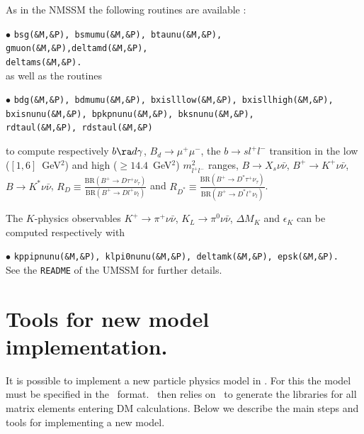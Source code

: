 \documentclass[12pt,a4paper]{article}
\begin{document}
As in the NMSSM the following routines are available :

\noindent
$\bullet$ {\tt bsg(\&M,\&P), bsmumu(\&M,\&P), btaunu(\&M,\&P),  gmuon(\&M,\&P),deltamd(\&M,\&P),}\\
{\tt deltams(\&M,\&P).}\\ 

\noindent as well as the routines

\noindent
$\bullet$ {\tt bdg(\&M,\&P), bdmumu(\&M,\&P), bxislllow(\&M,\&P), bxisllhigh(\&M,\&P),}\\ 
{\tt bxisnunu(\&M,\&P), bpkpnunu(\&M,\&P), bksnunu(\&M,\&P),}\\ 
{\tt rdtaul(\&M,\&P), rdstaul(\&M,\&P)}

\noindent to compute respectively $b\ra d\gamma$,  $B_d\to \mu^+\mu^-$, the $b \to s l^+l^-$ transition in the low ($[1,6]$~GeV$^2$) and high ($\geq14.4$~GeV$^2$) $m^2_{l^+l^-}$ ranges, $B \to X_s\nu\bar{\nu}$, $B^+ \to K^+\nu\bar{\nu}$, $B \to K^*\nu\bar{\nu}$, $R_D \equiv \frac{\textrm{BR}(B^+ \to D\tau^+\nu_{\tau})}{\textrm{BR}(B^+ \to Dl^+\nu_{l})}$ and 
$R_{D^*} \equiv \frac{\textrm{BR}(B^+ \to D^*\tau^+\nu_{\tau})}{\textrm{BR}(B^+ \to D^*l^+\nu_{l})}$.

The $K$-physics observables $K^+ \to \pi^+\nu\bar{\nu}$, $K_L \to \pi^0 \nu\bar{\nu}$, $\Delta M_K$ and $\epsilon_K$ can be computed respectively with

\noindent
$\bullet$ {\tt kppipnunu(\&M,\&P), klpi0nunu(\&M,\&P), deltamk(\&M,\&P), epsk(\&M,\&P).}\\ 

\noindent
See the \verb|README| of the UMSSM for further details.


\section{Tools for new model implementation.}


It is possible to  implement a new particle physics  model  in \micro.
For this the model must be specified in the
\calchep\ format. \micro\ then relies on \calchep\ 
to generate the libraries for all matrix elements entering DM calculations. 
Below we describe the main steps and tools for implementing a new model.
\end{document}
